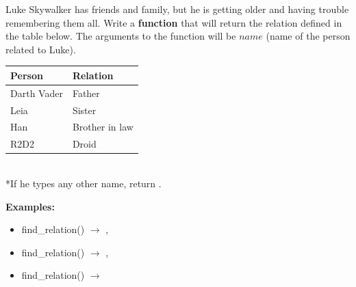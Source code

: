 	\item 
		Luke Skywalker has friends and family, but he is getting older and having trouble 
		remembering them all.  Write a \textbf{function} that will return the relation defined in the table below.
		The arguments to the function will be $name$ (name of the person related to Luke).\\ 
		\begin{center}
		\begin{tabular}{|l|l|} \hline
			Person 		& Relation \\ \hline \hline
			Darth Vader	& Father \\ \hline
			Leia		& Sister \\ \hline
			Han			& Brother in law\\ \hline
			R2D2		& Droid \\ \hline
		\end{tabular}\\ \hspace*{1in} *If he types any other name, return .
		\end{center}
		\textbf{Examples:}		
		\begin{itemize}
			\item  find\_relation() $\rightarrow$ , 
			\item  find\_relation() $\rightarrow$ , 
			\item  find\_relation() $\rightarrow$ 
		\end{itemize}


